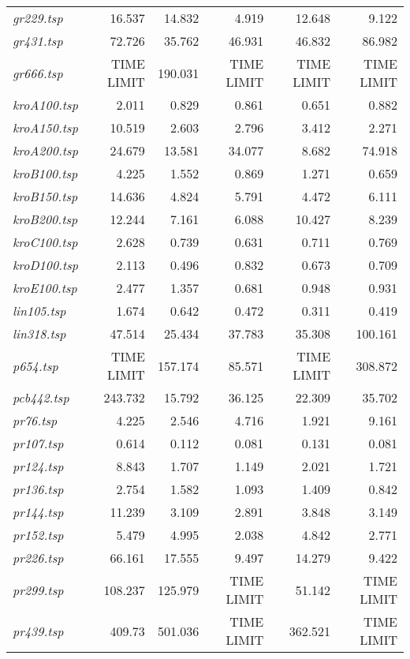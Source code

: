 {\begin{longtable}[H]{lrrrrr}
\textit{gr229.tsp} & 16.537 & 14.832 & 4.919 & 12.648 & 9.122\\
\textit{gr431.tsp} & 72.726 & 35.762 & 46.931 & 46.832 & 86.982\\
\textit{gr666.tsp} & TIME LIMIT & 190.031 & TIME LIMIT & TIME LIMIT & TIME LIMIT\\
\textit{kroA100.tsp} & 2.011 & 0.829 & 0.861 & 0.651 & 0.882\\
\textit{kroA150.tsp} & 10.519 & 2.603 & 2.796 & 3.412 & 2.271\\
\textit{kroA200.tsp} & 24.679 & 13.581 & 34.077 & 8.682 & 74.918\\
\textit{kroB100.tsp} & 4.225 & 1.552 & 0.869 & 1.271 & 0.659\\
\textit{kroB150.tsp} & 14.636 & 4.824 & 5.791 & 4.472 & 6.111\\
\textit{kroB200.tsp} & 12.244 & 7.161 & 6.088 & 10.427 & 8.239\\
\textit{kroC100.tsp} & 2.628 & 0.739 & 0.631 & 0.711 & 0.769\\
\textit{kroD100.tsp} & 2.113 & 0.496 & 0.832 & 0.673 & 0.709\\
\textit{kroE100.tsp} & 2.477 & 1.357 & 0.681 & 0.948 & 0.931\\
\textit{lin105.tsp} & 1.674 & 0.642 & 0.472 & 0.311 & 0.419\\
\textit{lin318.tsp} & 47.514 & 25.434 & 37.783 & 35.308 & 100.161\\
\textit{p654.tsp} & TIME LIMIT & 157.174 & 85.571 & TIME LIMIT & 308.872\\
\textit{pcb442.tsp} & 243.732 & 15.792 & 36.125 & 22.309 & 35.702\\
\textit{pr76.tsp} & 4.225 & 2.546 & 4.716 & 1.921 & 9.161\\
\textit{pr107.tsp} & 0.614 & 0.112 & 0.081 & 0.131 & 0.081\\
\textit{pr124.tsp} & 8.843 & 1.707 & 1.149 & 2.021 & 1.721\\
\textit{pr136.tsp} & 2.754 & 1.582 & 1.093 & 1.409 & 0.842\\
\textit{pr144.tsp} & 11.239 & 3.109 & 2.891 & 3.848 & 3.149\\
\textit{pr152.tsp} & 5.479 & 4.995 & 2.038 & 4.842 & 2.771\\
\textit{pr226.tsp} & 66.161 & 17.555 & 9.497 & 14.279 & 9.422\\
\textit{pr299.tsp} & 108.237 & 125.979 & TIME LIMIT & 51.142 & TIME LIMIT\\
\textit{pr439.tsp} & 409.73 & 501.036 & TIME LIMIT & 362.521 & TIME LIMIT\\

\end{longtable}}
